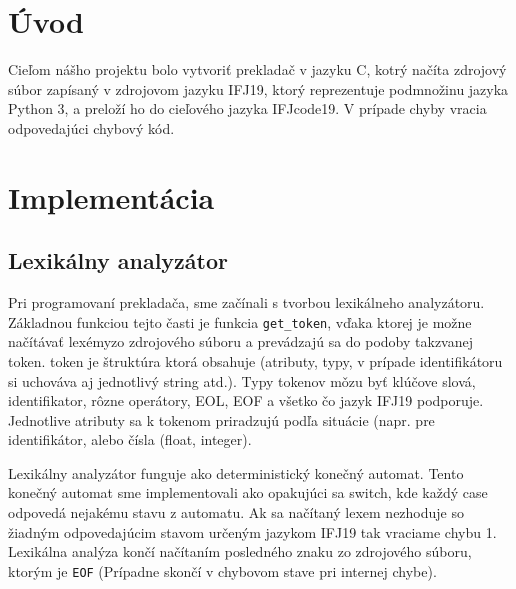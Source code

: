 \documentclass[a4paper, 11pt]{article}
\begin{document}
    \section{Úvod}
    Cieľom nášho projektu bolo vytvoriť prekladač v jazyku C, kotrý načíta zdrojový súbor zapísaný v zdrojovom jazyku IFJ19, ktorý reprezentuje podmnožinu jazyka Python 3, a preloží ho do cieľového jazyka IFJcode19. V prípade chyby vracia odpovedajúci chybový kód.
    
    \section{Implementácia}
    
    \begin{figure}[h]
		\centering
	\end{figure}
    
    \subsection{Lexikálny analyzátor}

    Pri programovaní prekladača, sme začínali s tvorbou lexikálneho analyzátoru. Základnou funkciou tejto časti je funkcia \texttt{get\_token}, vďaka ktorej je možne načítávať lexémy\footnotemark zo zdrojového súboru a prevádzajú sa do podoby takzvanej token. token je štruktúra ktorá obsahuje (atributy, typy, v prípade identifikátoru si uchováva aj jednotlivý string atd.). Typy tokenov mǒzu byť klúčove slová, identifikator, rôzne operátory, EOL, EOF a všetko čo jazyk IFJ19 podporuje. Jednotlive atributy sa k tokenom priradzujú podľa situácie (napr. pre identifikátor, alebo čísla (float, integer).
    
    Lexikálny analyzátor funguje ako deterministický konečný automat. Tento konečný automat sme implementovali ako opakujúci sa switch, kde každý case odpovedá nejakému stavu z automatu. Ak sa načítaný lexem nezhoduje so žiadným odpovedajúcim stavom určeným jazykom IFJ19 tak vraciame chybu 1. Lexikálna analýza končí načítaním posledného znaku zo zdrojového súboru, ktorým je \texttt{EOF} (Prípadne skončí v chybovom stave pri internej chybe). 
\end{document}
